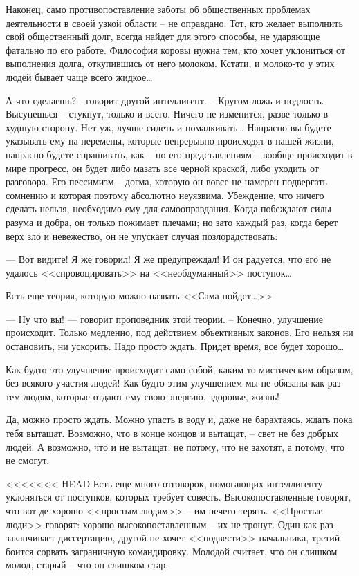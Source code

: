 \documentclass{book}
\begin{document}
Наконец, само противопоставление заботы об общественных проблемах деятельности в своей узкой области -- не оправдано. Тот, кто желает выполнить свой общественный долг, всегда найдет для этого способы, не ударяющие фатально по его ра­боте. Философия коровы нужна тем, кто хочет уклониться от выполнения долга, откупившись от него молоком. Кстати, и молоко-то у этих людей бывает чаще всего жидкое\ldots

А что сделаешь? - говорит другой интеллигент. -- Кругом ложь и подлость. Высунешься -- стукнут, только и всего. Ни­чего не изменится, разве только в худшую сторону. Нет уж, лучше сидеть и помалкивать\ldots
Напрасно вы будете указывать ему на перемены, которые непрерывно происходят в нашей жизни, напрасно будете спра­шивать, как -- по его представлениям -- вообще происходит в мире прогресс, он будет либо мазать все черной краской, либо уходить от разговора. Его пессимизм -- догма, которую он вовсе не намерен подвергать сомнению и которая поэтому абсолютно неуязвима. Убеждение, что ничего сделать нельзя, необходимо ему для самооправдания. Когда побеждают силы разума и добра, он только пожимает плечами; но зато каж­дый раз, когда берет верх зло и невежество, он не упускает случая позлорадствовать:

--- Вот видите! Я же говорил! Я же предупреждал! И он радуется, что его не удалось <<спровоцировать>> на <<не­обдуманный>> поступок\ldots

Есть еще теория, которую можно назвать <<Сама пойдет\ldots>>

--- Ну что вы! --- говорит проповедник этой теории. -- Конеч­но, улучшение происходит. Только медленно, под действием объективных законов. Его нельзя ни остановить, ни ускорить. Надо просто ждать. Придет время, все будет хорошо\ldots

Как будто это улучшение происходит само собой, каким-то мистическим образом, без всякого участия людей! Как будто этим улучшением мы не обязаны как раз тем людям, которые отдают ему свою энергию, здоровье, жизнь!

Да, можно просто ждать. Можно упасть в воду и, даже не барахтаясь, ждать пока тебя вытащат. Возможно, что в конце концов и вытащат, -- свет не без добрых людей. А возможно, что и не вытащат: не потому, что не захотят, а потому, что не смогут.

<<<<<<< HEAD
Есть еще много отговорок, помогающих интеллигенту уклоняться от поступков, которых требует совесть. Высокопоставленные говорят, что вот‑де хорошо <<простым людям>> -- им нечего терять. <<Простые люди>> говорят: хорошо высокопоставленным -- их не тронут. Один как раз заканчивает диссер­тацию, другой не хочет <<подвести>> начальника, третий боится сорвать заграничную командировку. Молодой считает, что он слишком молод, старый -- что он слишком стар.
\end{document}
